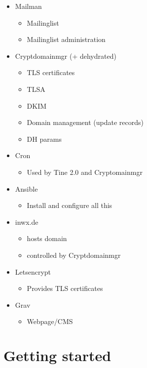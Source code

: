 \documentclass{beamer}
\begin{document}
\begin{frame}{\insertsection}{\insertsubsection}
\begin{itemize}
\begin{itemize}
				\item DKIM keygen
			\end{itemize}
			\item Mailman
			\begin{itemize}
				\item Mailinglist
				\item Mailinglist administration
			\end{itemize}
			\item Cryptdomainmgr (+ dehydrated)
			\begin{itemize}
				\item TLS certificates
				\item TLSA
				\item DKIM
				\item Domain management (update records)
				\item DH params
			\end{itemize}
			\item Cron
			\begin{itemize}
				\item Used by Tine 2.0 and Cryptomainmgr
			\end{itemize}
			\item Ansible
			\begin{itemize}
				\item Install and configure all this
			\end{itemize}
			\item inwx.de
			\begin{itemize}
				\item hosts domain
				\item controlled by Cryptdomainmgr
			\end{itemize}
			\item Letsencrypt
			\begin{itemize}
				\item Provides TLS certificates
			\end{itemize}
			\item Grav
			\begin{itemize}
				\item Webpage/CMS
			\end{itemize}
		\end{itemize}
	\end{frame}
	
\section{Getting started}
\end{document}
